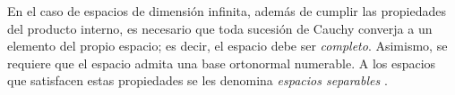 \documentclass[../Main.tex]{subfiles}
\begin{document}
En el caso de espacios de dimensión infinita, además de cumplir las propiedades del producto interno, es necesario que toda sucesión de Cauchy converja a un elemento del propio espacio; es decir, el espacio debe ser \emph{completo}. Asimismo, se requiere que el espacio admita una base ortonormal numerable. A los espacios que satisfacen estas propiedades se les denomina \emph{espacios separables} \cite{Messiah}.

\end{document}
